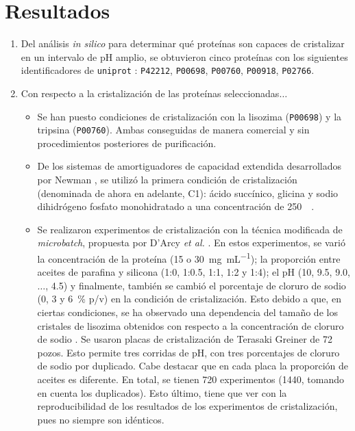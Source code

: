 \documentclass[11pt,letterpaper]{article}
\begin{document}
	\section{Resultados}
	\begin{enumerate}
		\item Del análisis \emph{in silico} para determinar qué proteínas son capaces de cristalizar en un intervalo de pH amplio, se obtuvieron cinco proteínas con los siguientes identificadores de \verb|uniprot| \cite{Bateman2021}: \verb|P42212|, \verb|P00698|, \verb|P00760|, \verb|P00918|, \verb|P02766|. 
		\item  Con respecto a la cristalización de las proteínas seleccionadas$\ldots$ 
		\begin{itemize}
		\item Se han puesto condiciones de cristalización con la lisozima (\verb|P00698|) y la tripsina (\verb|P00760|). Ambas conseguidas de manera comercial y sin procedimientos posteriores de purificación. 
		
		\item De los sistemas de amortiguadores de capacidad extendida desarrollados por Newman \cite{Newman2004}, se utilizó la primera condición de cristalización (denominada de ahora en adelante, C1): ácido succínico, glicina y sodio dihidrógeno fosfato monohidratado a una concentración de \SI{250}{\milli\Molar}. 
		
		\item Se realizaron experimentos de cristalización con la técnica modificada de \emph{microbatch}, propuesta por D'Arcy \emph{et al.} \cite{DArcy1996}. En estos experimentos, se varió la concentración de la proteína (15 o \SI{30}{\milli\gram\per\milli\liter}); la proporción entre aceites de parafina y silicona (1:0, 1:0.5, 1:1, 1:2 y 1:4); el pH (10, 9.5, 9.0, $\ldots$, 4.5) y finalmente, también se cambió el porcentaje de cloruro de sodio (0, 3 y \SI{6}{\percent} p/v) en la condición de cristalización. Esto debido a que, en ciertas condiciones, se ha observado una dependencia del tamaño de los cristales de lisozima obtenidos con respecto a la concentración de cloruro de sodio \cite{Svanidze2005}. Se usaron placas de cristalización de Terasaki Greiner de \num{72} pozos. Esto permite tres corridas de pH, con tres porcentajes de cloruro de sodio por duplicado. Cabe destacar que en cada placa la proporción de aceites es diferente. En total, se tienen \num{720} experimentos (\num{1440}, tomando en cuenta los duplicados). Esto último, tiene que ver con la reproducibilidad de los resultados de los experimentos de cristalización, pues no siempre son idénticos.
		

\end{itemize}
\end{enumerate}
\end{document}
